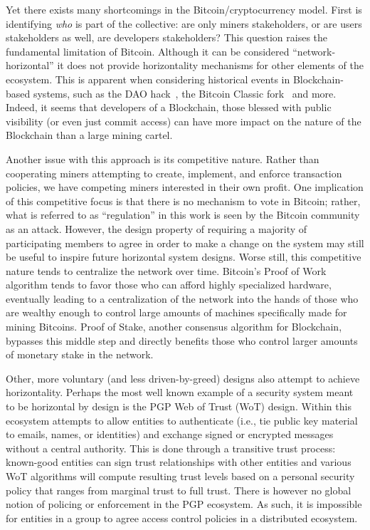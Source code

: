 Yet there exists many shortcomings in the Bitcoin/cryptocurrency model. First
is identifying \emph{who} is part of the collective: are only miners
stakeholders, or are users stakeholders as well, are developers stakeholders?
This question raises the fundamental limitation of Bitcoin. Although it can be
considered ``network-horizontal'' it does not provide  horizontality mechanisms
for other elements of the ecosystem. This is apparent when considering
historical events in Blockchain-based systems, such as the DAO hack~\cite{EthDAOHack},
the Bitcoin Classic fork~\cite{bitcoinForks} and more. Indeed, it seems that developers of
a Blockchain, those blessed with public visibility (or even just commit access)
can have more impact on the nature of the Blockchain than a large mining
cartel.

Another issue with this approach is its competitive nature. Rather than
cooperating miners attempting to create, implement, and enforce transaction
policies, we have competing miners interested in their own profit. One
implication of this competitive focus is that there is no mechanism to vote in
Bitcoin; rather, what is referred to as ``regulation'' in this work is seen by
the Bitcoin community as an attack. However, the design property of requiring
a majority of participating members to agree in order to make a change on the
system may still be useful to inspire future horizontal system designs. Worse
still, this competitive nature tends to centralize the network over time.
Bitcoin's Proof of Work algorithm tends to favor those who can afford highly
specialized hardware, eventually leading to a centralization of the network into
the hands of those who are wealthy enough to control large amounts of machines
specifically made for mining Bitcoins. Proof of Stake, another consensus
algorithm for Blockchain, bypasses this middle step and directly benefits those
who control larger amounts of monetary stake in the network.

Other, more voluntary (and less driven-by-greed) designs also attempt to
achieve horizontality. Perhaps the most well known example of a security system
meant to be horizontal by design is the PGP Web of Trust (WoT) design. Within
this ecosystem attempts to allow entities to authenticate (i.e., tie public key
material to emails, names, or identities) and exchange signed or encrypted
messages without a central authority. This is done through a transitive trust
process: known-good entities can sign trust relationships with other entities
and various WoT algorithms will compute resulting trust levels based on a
personal security policy that ranges from marginal trust to full trust. There is
however no global notion of policing or enforcement in the PGP ecosystem. As
such, it is impossible for entities in a group to agree access control policies
in a distributed ecosystem.

